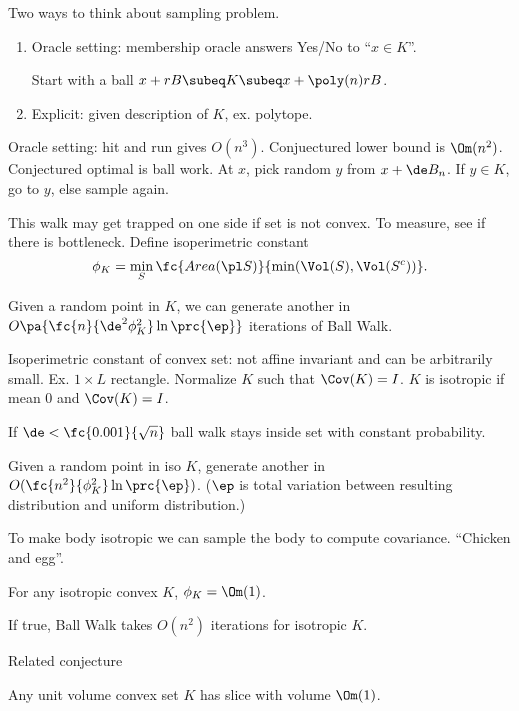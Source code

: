 Two ways to think about sampling problem.
\begin{enumerate}
\item
Oracle setting: membership oracle answers Yes/No to ``$x\in K$''.

Start with a ball $x+rB\subeq K \subeq x+\poly(n)rB$.
\item
Explicit: given description of $K$, ex. polytope.
\end{enumerate}

Oracle setting: hit and run gives $O(n^3)$. Conjuectured lower bound is $\Om(n^2)$. Conjectured optimal is ball work. At $x$, pick random $y$ from $x+\de B_n$. If $y\in K$, go to $y$, else sample again. 

This walk may get trapped on one side if set is not convex. To measure, see if there is bottleneck. Define isoperimetric constant
$$
\phi_K = \min_S\fc{Area(\pl S)}{\min(\Vol(S), \Vol(S^c))}.
$$
\begin{thm}
Given a random point in $K$, we can generate another in $O\pa{\fc{n}{\de^2\phi_K^2}\ln \prc{\ep}}$ iterations of Ball Walk.
\end{thm}

Isoperimetric constant of convex set: not affine invariant and can be arbitrarily small. Ex. $1\times L$ rectangle. Normalize $K$ such that $\Cov(K)=I$. 
$K$ is isotropic if mean 0 and $\Cov(K)=I$. 
\begin{thm}
If $\de<\fc{0.001}{\sqrt n}$ ball walk stays inside set with constant probability.
\end{thm}
\begin{thm}
Given a random point in iso $K$, generate another in $O(\fc{n^2}{\phi_K^2}\ln \prc{\ep})$. ($\ep$ is total variation between resulting distribution and uniform distribution.)
\end{thm}
To make body isotropic we can sample the body to compute covariance. ``Chicken and egg''.

\begin{conj}
For any isotropic convex $K$, $\phi_K=\Om(1)$.
\end{conj}
If true, Ball Walk takes $O(n^2)$ iterations for isotropic $K$.

Related conjecture
\begin{conj}
Any unit volume convex set $K$ has slice with volume $\Om(1)$.
\end{conj}

